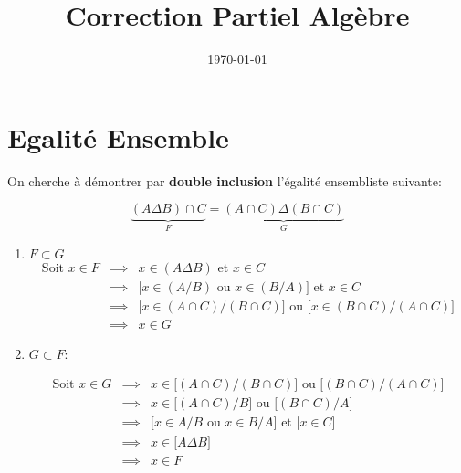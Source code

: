 \documentclass[12pt,a4paper,dvipsnames]{article}
\title{Correction Partiel Algèbre}
\date{\today}
\begin{document}
{\maketitle}

\section{Egalité Ensemble}%
\label{sec:egalité_ensemble}

On cherche à démontrer par \textbf{double inclusion} l'égalité ensembliste
suivante:

\begin{equation}
    \label{eq:equa_ensemble}
    \underbrace{(A \Delta B) \cap C}_{F} = \underbrace{(A\cap C) \Delta (B\cap
    C)}_{G}
\end{equation}

\begin{enumerate}
    \item $F \subset G$
        \begin{eqnarray*}
            \text{Soit } x\in F & \implies&  x\in (A\Delta B) \text{ et }
            x\in C\\[4pt]
                                & \implies & \big[x\in (A/B) \text{ ou }
                                x\in (B/ A)\big] \text{ et } x\in C\\[4pt]
                                &\implies & \big[ x \in (A\cap C)
                                    /(B\cap C)\big] \text{ ou } \big[ x \in (B\cap C)
                                /(A\cap C)\big] \\[4pt]
                                &\implies& x \in G
        \end{eqnarray*}

    \item $G \subset F$:

        \begin{eqnarray*}
            \text{Soit } x\in G  & \implies &   x\in \big[ (A\cap C) / (B\cap
            C)\big]\text{ ou } \big[ (B\cap C) / (A\cap
    C)\big]\\[4pt]
      & \implies & x\in \big[ (A\cap C) / B\big]\text{ ou } \big[ (B\cap C) /
  A\big]\\[4pt]
  & \implies & \big[ x \in A/B \text{ ou } x \in B/A\big] \text{ et } \big[x\in
  C\big]\\
    & \implies & x\in \big[ A \Delta B\big]\\[4pt]
  & \implies & x\in F
        \end{eqnarray*}

\end{enumerate}
\end{document}
